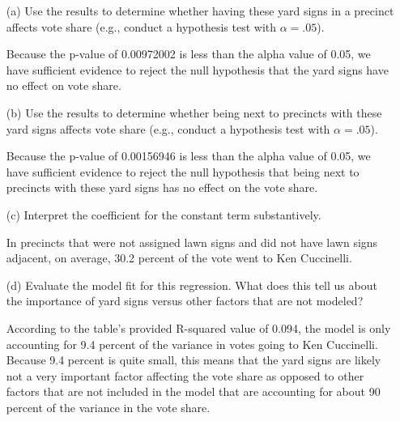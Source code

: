 \documentclass[12pt,letterpaper]{article}
\begin{document}
\vspace{.5cm}
\begin{enumerate}
	\item [(a)] Use the results to determine whether having these yard signs in a precinct affects vote share (e.g., conduct a hypothesis test with $\alpha = .05$).
\vspace{1cm}

\vspace{1cm}

\noindent Because the p-value of 0.00972002 is less than the alpha value of 0.05, we have sufficient evidence to reject the null hypothesis that the yard signs have no effect on vote share. 
	\newpage		
	\item [(b)]  Use the results to determine whether being
	next to precincts with these yard signs affects vote
	share (e.g., conduct a hypothesis test with $\alpha = .05$).
\vspace{1cm}

\vspace{1cm}

\noindent Because the p-value of 0.00156946 is less than the alpha value of 0.05, we have sufficient evidence to reject the null hypothesis that being next to precincts with these yard signs has no effect on the vote share.	
	\vspace{3cm}
	\item [(c)] Interpret the coefficient for the constant term substantively.
	\vspace{1cm}
	
\noindent In precincts that were not assigned lawn signs and did not have lawn signs adjacent, on average, 30.2 percent of the vote went to Ken Cuccinelli. 
\vspace{1cm}
	
	\item [(d)] Evaluate the model fit for this regression.  What does this	tell us about the importance of yard signs versus other factors that are not modeled?
\vspace{1cm}

\noindent According to the table's provided R-squared value of 0.094, the model is only accounting for 9.4 percent of the variance in votes going to Ken Cuccinelli. Because 9.4 percent is quite small, this means that the yard signs are likely not a very important factor affecting the vote share as opposed to other factors that are not included in the model that are accounting for about 90 percent of the variance in the vote share. 
	
\end{enumerate}  

\newpage
\end{document}
